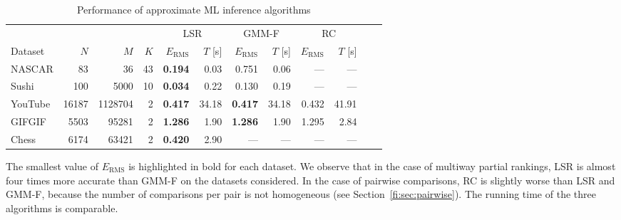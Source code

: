 \begin{table}[ht]
  \caption{Performance of approximate ML inference algorithms}
  \label{fi:tab:approxalg}
  \centering
  \small{
  \begin{tabular}{l rrr rr rr rr rr}
    \toprule
            &             &               &          & \multicolumn{2}{c}{LSR}            & \multicolumn{2}{c}{GMM-F}          & \multicolumn{2}{c}{RC} \\
                                                       \cmidrule(l){5-6}                    \cmidrule(l){7-8}                    \cmidrule(l){9-10}
    Dataset &         $N$ &           $M$ &      $K$ &     $E_{\text{RMS}}$ &     $T$ [s] &     $E_{\text{RMS}}$ &     $T$ [s] & $E_{\text{RMS}}$ & $T$ [s] \\
    \midrule
    NASCAR  &    \num{83} &      \num{36} & \num{43} & \bfseries\num{0.194} &  \num{0.03} &          \num{0.751} &  \num{0.06} &         --- &         --- \\
    Sushi   &   \num{100} &    \num{5000} & \num{10} & \bfseries\num{0.034} &  \num{0.22} &          \num{0.130} &  \num{0.19} &         --- &         --- \\
    \addlinespace                                                                                                             
    YouTube & \num{16187} & \num{1128704} &  \num{2} & \bfseries\num{0.417} & \num{34.18} & \bfseries\num{0.417} & \num{34.18} & \num{0.432} & \num{41.91} \\
    GIFGIF  &  \num{5503} &   \num{95281} &  \num{2} & \bfseries\num{1.286} &  \num{1.90} & \bfseries\num{1.286} &  \num{1.90} & \num{1.295} &  \num{2.84} \\
    \addlinespace                                                                                                             
    Chess   &  \num{6174} &   \num{63421} &  \num{2} & \bfseries\num{0.420} &  \num{2.90} &                  --- &         --- &         --- &         --- \\
    \bottomrule
  \end{tabular}
  }
\end{table}

The smallest value of $E_{\text{RMS}}$ is highlighted in bold for each dataset.
We observe that in the case of multiway partial rankings, LSR is almost four times more accurate than GMM-F on the datasets considered.
In the case of pairwise comparisons, RC is slightly worse than LSR and GMM-F, because the number of comparisons per pair is not homogeneous (see Section~\ref{fi:sec:pairwise}).
The running time of the three algorithms is comparable.

